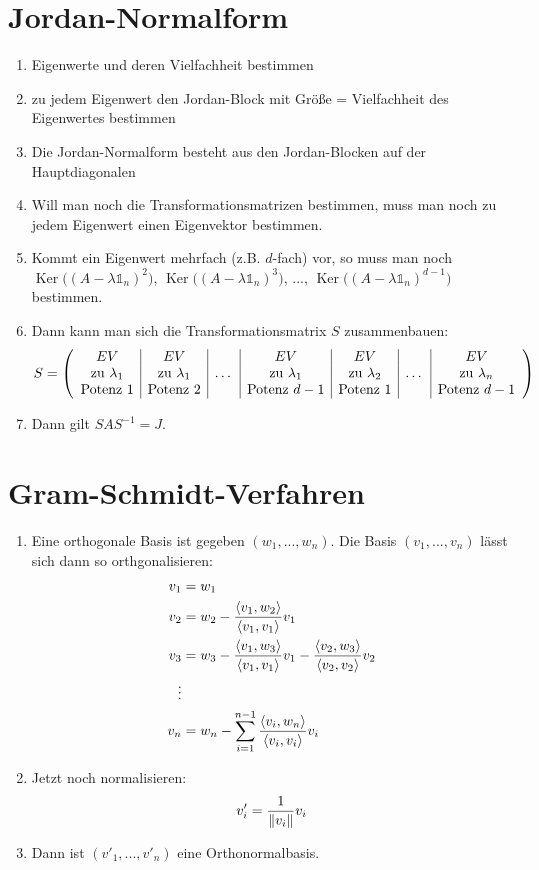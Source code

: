 \documentclass[ngerman,a4paper]{article}
\DeclareMathOperator{\Ker}{Ker}
\begin{document}
\section{Jordan-Normalform}
\begin{enumerate}[label=\textbf{\arabic*.}]
	\item Eigenwerte und deren Vielfachheit bestimmen
	\item zu jedem Eigenwert den Jordan-Block mit Größe = Vielfachheit des Eigenwertes bestimmen
	\item Die Jordan-Normalform besteht aus den Jordan-Blocken auf der Hauptdiagonalen
	\item Will man noch die Transformationsmatrizen bestimmen, muss man noch zu jedem Eigenwert einen Eigenvektor bestimmen.
	\item Kommt ein Eigenwert mehrfach (z.B. $d$-fach) vor, so muss man noch $\Ker\big((A-\lambda\mathbb{1}_n)^2\big)$, $\Ker\big((A-\lambda\mathbb{1}_n)^3\big)$, ..., $\Ker\big((A-\lambda\mathbb{1}_n)^{d-1}\big)$ bestimmen.
	\item Dann kann man sich die Transformationsmatrix $S$ zusammenbauen:
	\begin{align}
		S = \left(\begin{array}{c|c|c|c|c|c|c}
		EV & EV &  & EV & EV &  & EV \\
		\text{zu }\lambda_1 & \text{zu }\lambda_1 & \dots & \text{zu }\lambda_1 & \text{zu }\lambda_2 & \dots & \text{zu }\lambda_n \\
		\text{Potenz }1 & \text{Potenz }2 & & \text{Potenz }d-1 & \text{Potenz }1 & & \text{Potenz }d-1
		\end{array}\right)\notag
	\end{align}
	\item Dann gilt $SAS^{-1}=J$.
\end{enumerate}

\section{Gram-Schmidt-Verfahren}
\begin{enumerate}[label=\textbf{\arabic*.}]
	\item Eine orthogonale Basis ist gegeben $(w_1,...,w_n)$. Die Basis $(v_1,...,v_n)$ lässt sich dann so orthgonalisieren:
	\begin{align}
		v_1 &= w_1 \notag \\
		v_2 &= w_2 - \frac{\langle v_1,w_2 \rangle}{\langle v_1,v_1 \rangle}v_1 \notag \\
		v_3 &= w_3 - \frac{\langle v_1,w_3\rangle}{\langle v_1,v_1\rangle}v_1 - \frac{\langle v_2,w_3\rangle}{\langle v_2,v_2\rangle}v_2 \notag \\
		\vdots \notag \\
		v_n &= w_n - \sum_{i=1}^{n-1} \frac{\langle v_i,w_n\rangle}{\langle v_i,v_i\rangle}v_i\notag
	\end{align}
	\item Jetzt noch normalisieren:
	\begin{align}
		v'_i = \frac{1}{\Vert v_i\Vert}v_i\notag
	\end{align}
	\item Dann ist $(v'_1,...,v'_n)$ eine Orthonormalbasis.
\end{enumerate}
\end{document}
